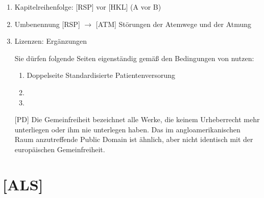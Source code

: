 \documentclass[
ngerman,
paper=a4,
asymmetric,
fontsize=10pt,
draft=false,
numbers=noenddot,
bibtotocnumbered,
footnotes=multiple,
]{scrreprt}
\newcommand{\jNEUende}{\newline{\color{green}\rule{\linewidth}{3pt}\newline}}
\begin{document}
\begin{enumerate}
So sind der Titel dieses Werkes und darin
enthaltene Handlungsempfehlungen nicht im Sinne eines
standardisierten, rigiden Prozessmanagements zu verstehen,
sondern sie sollen einen  bezüglich
medizinisch-sanitätsdienstlicher Versorgung, Wissen und
Kompetenz bilden, der individuell -- je nach Situation 
bzw. durch vom Helfer erworbenen Wissens -- 
jederzeit verbesser- und erweiterbar ist. 
Die {\AASS} geben Empfehlungen, es obliegt dem Helfer diese gemäß seiner 
fachlichen Erfahrung und Kenntnisse zu interpretieren, einzusetzen oder
anzupassen -- 

\footnote{salus aegroti suprema lex : }.
\jNEUende
\item Kapitelreihenfolge: [RSP] vor [HKL] (A vor B)
\item Umbenennung [RSP] $\to$ [ATM] Störungen der Atemwege und der Atmung
\item Lizenzen: Ergänzungen

     Sie dürfen folgende Seiten eigenständig gemäß den
     Bedingungen von  nutzen:
     \begin{enumerate}
       \item Doppelseite Standardisierte Patientenversorung
      \item {}
      \item {}
     \end{enumerate}
     
    [PD]
 Die Gemeinfreiheit bezeichnet alle Werke, die keinem Urheberrecht mehr unterliegen
 oder ihm nie unterlegen haben. Das im angloamerikanischen Raum anzutreffende
 Public Domain ist ähnlich, aber nicht identisch mit der europäischen
 Gemeinfreiheit.
\end{enumerate}

\section{[ALS]}
 
\end{document}
